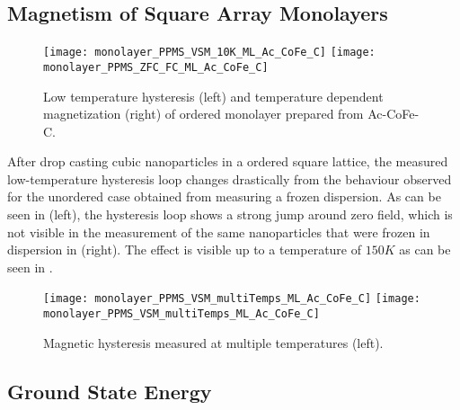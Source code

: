 \documentclass[\main/dresen_thesis.tex]{subfiles}
\renewcommand{\thisPath}{\main/chapters/monolayers/magnetism}
\begin{document}
  \subsection{Magnetism of Square Array Monolayers}
  \label{sec:monolayers:magneticStructure}
  \begin{figure}[tb]
    \centering
    \texttt{[image: monolayer\_PPMS\_VSM\_10K\_ML\_Ac\_CoFe\_C]}
    \texttt{[image: monolayer\_PPMS\_ZFC\_FC\_ML\_Ac\_CoFe\_C]}
    \caption{\label{fig:monolayer:magneticStructure:ppms}Low temperature hysteresis (left) and temperature dependent magnetization (right) of ordered monolayer prepared from Ac-CoFe-C.}
  \end{figure}
  After drop casting cubic nanoparticles in a ordered square lattice, the measured low-temperature hysteresis loop changes drastically from the behaviour observed for the unordered case obtained from measuring a frozen dispersion.
  As can be seen in  (left), the hysteresis loop shows a strong jump around zero field, which is not visible in the measurement of the same nanoparticles that were frozen in dispersion in  (right).
  The effect is visible up to a temperature of $150 \unit{K}$ as can be seen in .
  \begin{figure}[tb]
    \centering
    \texttt{[image: monolayer\_PPMS\_VSM\_multiTemps\_ML\_Ac\_CoFe\_C]}
    \texttt{[image: monolayer\_PPMS\_VSM\_multiTemps\_ML\_Ac\_CoFe\_C]}
    \caption{\label{fig:monolayer:magneticStructure:ppmsMultiT}Magnetic hysteresis measured at multiple temperatures (left).}
  \end{figure}
  

  \subsection{Ground State Energy}
    
    \FloatBarrier


\end{document}
